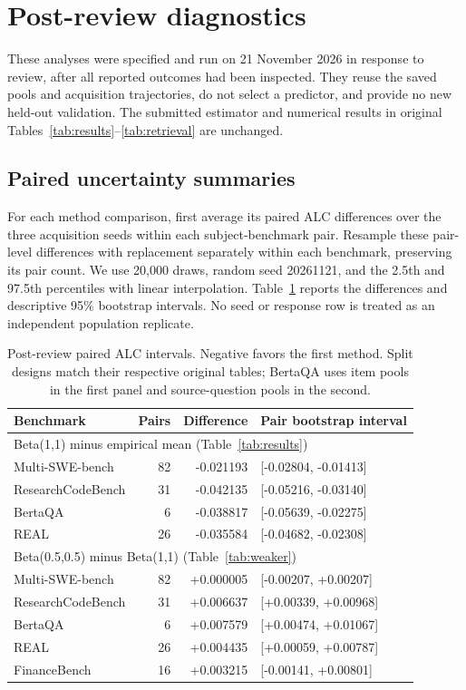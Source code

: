 \documentclass{article}
\begin{document}
\clearpage
\section{Post-review diagnostics}\label{app:postreview}
These analyses were specified and run on 21 November 2026 in response to
review, after all reported outcomes had been inspected. They reuse the
saved pools and acquisition trajectories, do not select a predictor, and
provide no new held-out validation. The submitted estimator and numerical
results in original Tables~\ref{tab:results}--\ref{tab:retrieval} are unchanged.

\subsection{Paired uncertainty summaries}
For each method comparison, first average its paired ALC differences over
the three acquisition seeds within each subject-benchmark pair. Resample
these pair-level differences with replacement separately within each benchmark,
preserving its pair count. We use 20,000 draws, random seed 20261121, and the
2.5th and 97.5th percentiles with linear interpolation. Table~\ref{tab:intervals}
reports the differences and descriptive 95\% bootstrap intervals. No seed or
response row is treated as an independent population replicate.

\begin{table}[ht]
\centering\small
\caption{Post-review paired ALC intervals. Negative favors the first method.
Split designs match their respective original tables; BertaQA uses item
pools in the first panel and source-question pools in the second.}
\label{tab:intervals}
\begin{tabular}{lrrl}
\toprule
Benchmark & Pairs & Difference & Pair bootstrap interval \\
\midrule
\multicolumn{4}{l}{Beta(1,1) minus empirical mean (Table~\ref{tab:results})} \\
Multi-SWE-bench & 82 & -0.021193 & [-0.02804, -0.01413] \\
ResearchCodeBench & 31 & -0.042135 & [-0.05216, -0.03140] \\
BertaQA & 6 & -0.038817 & [-0.05639, -0.02275] \\
REAL & 26 & -0.035584 & [-0.04682, -0.02308] \\
\midrule
\multicolumn{4}{l}{Beta(0.5,0.5) minus Beta(1,1) (Table~\ref{tab:weaker})} \\
Multi-SWE-bench & 82 & +0.000005 & [-0.00207, +0.00207] \\
ResearchCodeBench & 31 & +0.006637 & [+0.00339, +0.00968] \\
BertaQA & 6 & +0.007579 & [+0.00474, +0.01067] \\
REAL & 26 & +0.004435 & [+0.00059, +0.00787] \\
FinanceBench & 16 & +0.003215 & [-0.00141, +0.00801] \\
\bottomrule
\end{tabular}
\end{table}
\end{document}
